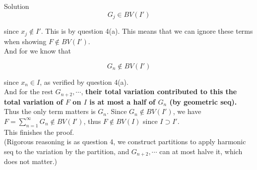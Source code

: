 \documentclass{qlnotes-export}
\begin{document}
\begin{qlsolution}{Solution}
\[G_{j} \in BV(I')\]

since \(x_{j} \notin I'\). This is by question 4(a). This means that we can ignore these terms when showing \(F \notin BV(I')\).\\
And for we know that

\[G_{n} \notin BV(I')\]

since \(x_{n} \in I\), as verified by question 4(a).\\
And for the rest \(G_{n + 2},\cdots\), \textbf{their total variation contributed to this the total variation of \(F\) on \(I\) is at most a half of \(G_{n}\) (by geometric seq).}\\
Thus the only term matters is \(G_{n}\). Since \(G_{n} \notin BV(I')\), we have \(F = \sum_{n = 1}^{\infty}G_{n} \notin BV(I')\), thus \(F \notin BV(I)\) since \(I \supset I'\).\\
This finishes the proof.\\
(Rigorous reasoning is as question 4, we construct partitions to apply harmonic seq to the variation by the partition, and \(G_{n + 2},\cdots\) can at most halve it, which does not matter.)

\end{qlsolution}
\end{document}
